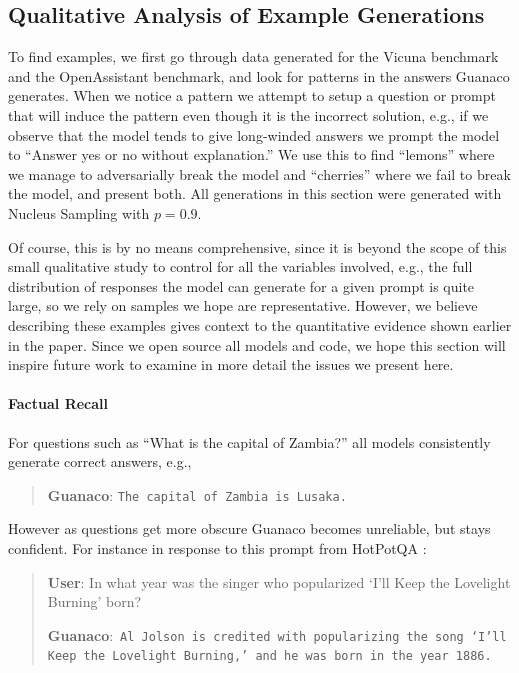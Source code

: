 \subsection{Qualitative Analysis of Example Generations}
\label{ssec:examples}

To find examples, we first go through data generated for the Vicuna benchmark and the OpenAssistant benchmark, and look for patterns in the answers {Guanaco} generates. When we notice a pattern we attempt to setup a question or prompt that will induce the pattern even though it is the incorrect solution, e.g., if we observe that the model tends to give long-winded answers we prompt the model to ``Answer yes or no without explanation.'' We use this to find ``lemons'' where we manage to adversarially break the model and ``cherries'' where we fail to break the model, and present both. All generations in this section were generated with Nucleus Sampling \cite{holtzmancurious} with $p=0.9$.

Of course, this is by no means comprehensive, since it is beyond the scope of this small qualitative study to control for all the variables involved, e.g., the full distribution of responses the model can generate for a given prompt is quite large, so we rely on samples we hope are representative. However, we believe describing these examples gives context to the quantitative evidence shown earlier in the paper. Since we open source all models and code, we hope this section will inspire future work to examine in more detail the issues we present here.
\paragraph{Factual Recall} For questions such as ``What is the capital of Zambia?'' all models consistently generate correct answers, e.g.,

\begin{quote} 
    \textbf{Guanaco}:
    \texttt{The capital of Zambia is Lusaka.}
\end{quote}

 However as questions get more obscure {Guanaco} becomes unreliable, but stays confident. For instance in response to this  prompt from HotPotQA \citep{yang2018hotpotqa}:

\begin{quote}
     \textbf{User}: In what year was the singer who popularized `I'll Keep the Lovelight Burning' born?  

     \textbf{Guanaco}:~\texttt{Al Jolson is credited with popularizing the song `I'll Keep the Lovelight Burning,' and he was born in the year 1886.}
 \end{quote}

